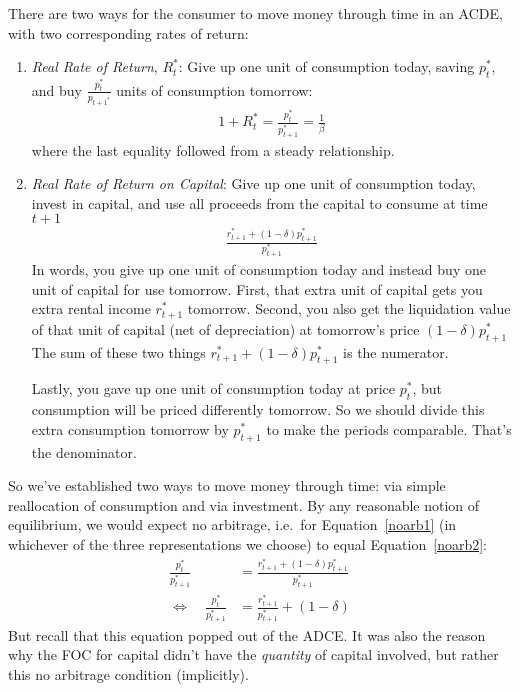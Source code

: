 \documentclass[12pt]{article}
\theoremstyle{plain}
\theoremstyle{definition}
\theoremstyle{remark}
\begin{document}
There are two ways for the consumer to move money through time in an
ACDE, with two corresponding rates of return:
\begin{enumerate}
  \item \emph{Real Rate of Return}, $R_t^*$: Give up one unit of
    consumption today, saving $p_t^*$, and buy $\frac{p_t^*}{p_{t+1^*}}$
    units of consumption tomorrow:
    \begin{align}
      1+R_t^* = \frac{p_t^*}{p_{t+1}^*} = \frac{1}{\beta}
      \label{noarb1}
    \end{align}
    where the last equality followed from a steady relationship.

  \item \emph{Real Rate of Return on Capital}: Give up one unit of
    consumption today, invest in capital, and use all proceeds from the
    capital to consume at time $t+1$
    \begin{align}
      \frac{r_{t+1}^* + (1-\delta)p_{t+1}^*}{p_{t+1}^*}
      \label{noarb2}
    \end{align}
    In words, you give up one unit of consumption today and instead buy
    one unit of capital for use tomorrow.
    First, that extra unit of capital gets you extra rental income
    $r_{t+1}^*$ tomorrow.
    Second, you also get the liquidation value of that unit of capital
    (net of depreciation) at tomorrow's price $(1-\delta)p_{t+1}^*$
    The sum of these two things $r_{t+1}^* + (1-\delta)p_{t+1}^*$ is the
    numerator.

    Lastly, you gave up one unit of consumption today at price $p_t^*$,
    but consumption will be priced differently tomorrow.  So we should
    divide this extra consumption tomorrow by $p_{t+1}^*$ to make the
    periods comparable. That's the denominator.
\end{enumerate}
So we've established two ways to move money through time: via simple
reallocation of consumption and via investment. By any reasonable notion
of equilibrium, we would expect no arbitrage, i.e.\ for
Equation~\ref{noarb1} (in whichever of the three representations we
choose) to equal Equation~\ref{noarb2}:
\begin{align*}
  \frac{p_t^*}{p_{t+1}^*}
  &=
  \frac{r_{t+1}^* + (1-\delta)p_{t+1}^*}{p_{t+1}^*} \\
  \Leftrightarrow\quad
  \frac{p_t^*}{p_{t+1}^*}
  &=
  \frac{r_{t+1}^*}{p_{t+1}^*} + (1-\delta)
\end{align*}
But recall that this equation popped out of the ADCE. It was also the
reason why the FOC for capital didn't have the \emph{quantity} of
capital involved, but rather this no arbitrage condition (implicitly).
\end{document}
